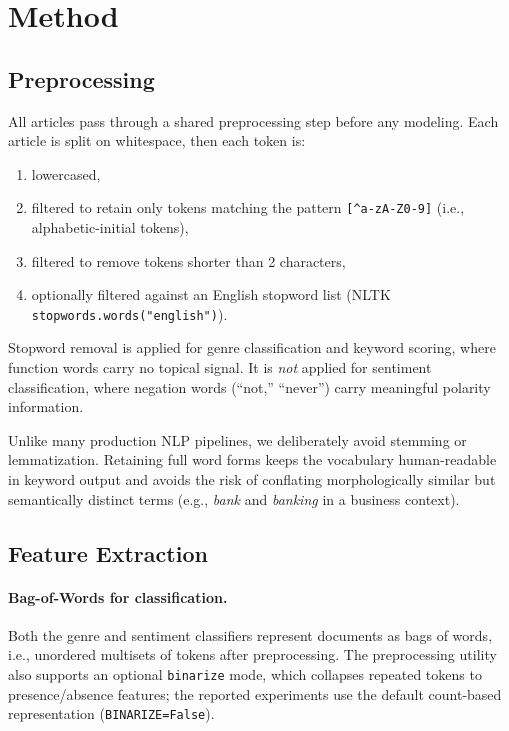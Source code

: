 \section{Method}
\label{sec:method}

\subsection{Preprocessing}

All articles pass through a shared preprocessing step before any modeling. Each article is split on whitespace, then each token is:

\begin{enumerate}
    \item lowercased,
    \item filtered to retain only tokens matching the pattern \texttt{[\^{}a-zA-Z0-9]} (i.e., alphabetic-initial tokens),
    \item filtered to remove tokens shorter than 2 characters,
    \item optionally filtered against an English stopword list (NLTK \texttt{stopwords.words("english")}).
\end{enumerate}

Stopword removal is applied for genre classification and keyword scoring, where function words carry no topical signal. It is \emph{not} applied for sentiment classification, where negation words (``not,'' ``never'') carry meaningful polarity information.

Unlike many production NLP pipelines, we deliberately avoid stemming or lemmatization. Retaining full word forms keeps the vocabulary human-readable in keyword output and avoids the risk of conflating morphologically similar but semantically distinct terms (e.g., \textit{bank} and \textit{banking} in a business context).

\subsection{Feature Extraction}

\paragraph{Bag-of-Words for classification.}
Both the genre and sentiment classifiers represent documents as bags of words, i.e., unordered multisets of tokens after preprocessing. The preprocessing utility also supports an optional \texttt{binarize} mode, which collapses repeated tokens to presence/absence features; the reported experiments use the default count-based representation (\texttt{BINARIZE=False}).

